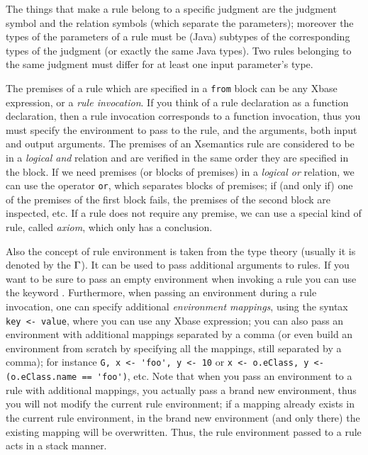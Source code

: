 The things that make a rule belong to a specific judgment are the judgment
symbol and the relation symbols (which separate the parameters); moreover the
types of the parameters of a rule must be (Java) subtypes of the corresponding types
of the judgment (or exactly the same Java types).  Two rules belonging to the
same judgment must differ for at least one input parameter's type.

The premises of a rule which are specified in a \verb|from| block can be any
Xbase expression, or a \emph{rule invocation}.  If you think of a rule
declaration as a function declaration, then a rule invocation corresponds to a
function invocation, thus you must specify the environment to pass to the rule,
and the arguments, both input and output arguments.
The premises of an Xsemantics rule are considered to be in a \emph{logical and}
relation and are verified in the same order they are specified in the block.
If we need premises (or blocks of premises) in a \emph{logical or} relation, we
can use the operator \verb|or|, which separates blocks of premises; if (and only
if) one of the premises of the first block fails, the premises of the second
block are inspected, etc.
If a rule does not require any premise, we can use a special kind of rule,
called \textit{axiom}, which only has a conclusion.

Also the concept of rule environment is taken from the type theory (usually it
is denoted by the $\Gamma$).  It can be used to pass additional arguments to rules.
If you want to be sure to pass an empty environment when invoking a rule you can
use the keyword .
Furthermore, when passing an environment during a rule invocation, one
can specify additional \emph{environment mappings}, using the syntax
\lstinline[breakatwhitespace=false,breaklines=true]!key <- value!, 
where you can use any Xbase expression;
you can also pass an environment with additional
mappings separated by a comma (or even build an environment from scratch
by specifying all the mappings, still separated by a comma); for instance
\lstinline[breakatwhitespace=false,breaklines=true]!G, x <- 'foo', y <- 10! 
or
\lstinline[breakatwhitespace=false,breaklines=true]!x <- o.eClass, y <- (o.eClass.name == 'foo')!, 
etc.
Note that when you pass an environment to a rule with additional mappings,
you actually pass a brand new environment, thus you will not modify the
current rule environment; if a mapping already exists in the current rule
environment, in the brand new environment (and only there) the existing mapping
will be overwritten.  Thus, the rule environment passed to a rule acts
in a stack manner.

